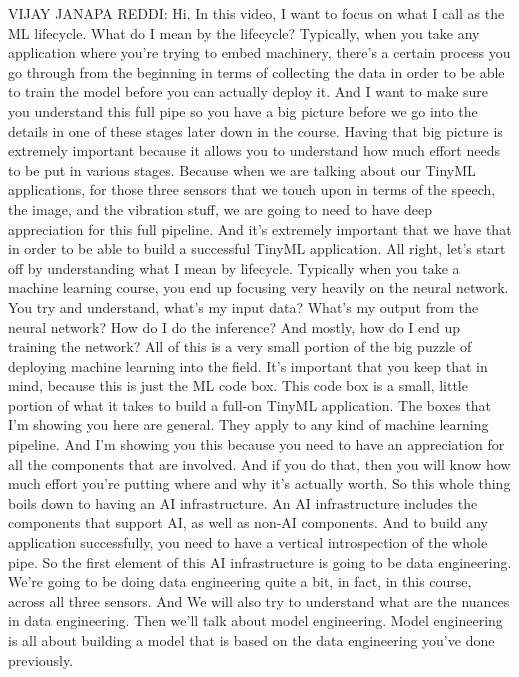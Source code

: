 VIJAY JANAPA REDDI: Hi.
In this video, I want to focus on what I call as the ML lifecycle.
What do I mean by the lifecycle?
Typically, when you take any application where
you're trying to embed machinery, there's
a certain process you go through from the beginning in terms
of collecting the data in order to be able to train the model before you
can actually deploy it.
And I want to make sure you understand this full pipe so you
have a big picture before we go into the details in one of these stages
later down in the course.
Having that big picture is extremely important
because it allows you to understand how much effort
needs to be put in various stages.
Because when we are talking about our TinyML applications,
for those three sensors that we touch upon
in terms of the speech, the image, and the vibration stuff,
we are going to need to have deep appreciation for this full pipeline.
And it's extremely important that we have that
in order to be able to build a successful TinyML application.
All right, let's start off by understanding what I mean by lifecycle.
Typically when you take a machine learning course,
you end up focusing very heavily on the neural network.
You try and understand, what's my input data?
What's my output from the neural network?
How do I do the inference?
And mostly, how do I end up training the network?
All of this is a very small portion of the big puzzle of deploying
machine learning into the field.
It's important that you keep that in mind,
because this is just the ML code box.
This code box is a small, little portion of what it takes
to build a full-on TinyML application.
The boxes that I'm showing you here are general.
They apply to any kind of machine learning pipeline.
And I'm showing you this because you need
to have an appreciation for all the components that are involved.
And if you do that, then you will know how much effort you're putting
where and why it's actually worth.
So this whole thing boils down to having an AI infrastructure.
An AI infrastructure includes the components
that support AI, as well as non-AI components.
And to build any application successfully,
you need to have a vertical introspection of the whole pipe.
So the first element of this AI infrastructure
is going to be data engineering.
We're going to be doing data engineering quite a bit, in fact, in this course,
across all three sensors.
And We will also try to understand what are the nuances in data engineering.
Then we'll talk about model engineering.
Model engineering is all about building a model
that is based on the data engineering you've done previously.
